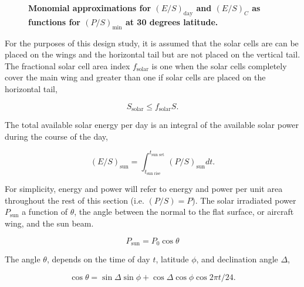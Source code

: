 \documentclass[]{aiaa-tc}%
\begin{document}
\begin{figure}[H]
 \begin{subfigmatrix}{2}%
 \end{subfigmatrix}
 \caption{\textbf{Monomial approximations for $(E/S)_{\text{day}}$ and $(E/S)_C$ as functions for $(P/S)_{\text{min}}$ at 30 degrees latitude.}}
 \label{f:energyapprox}
\end{figure}

    For the purposes of this design study, it is assumed that the solar cells are can be placed on the wings and the horizontal tail but are not placed on the vertical tail.  
    The fractional solar cell area index $f_{\text{solar}}$ is one when the solar cells completely cover the main wing and greater than one if solar cells are placed on the horizontal tail,

\begin{equation}
    \label{e:solarssolar}
    S_{\text{solar}} \leq f_{\text{solar}}S.
\end{equation}

The total available solar energy per day is an integral of the available solar power during the course of the day,

    \begin{equation}
        \label{e:solares}
        (E/S)_{\text{sun}} = \int_{t_{\text{sun rise}}}^{t_{\text{sun set}}} (P/S)_{\text{sun}} dt.
    \end{equation}
    
For simplicity, energy and power will refer to energy and power per unit area throughout the rest of this section (i.e. $(P/S) = P$). 
The solar irradiated power $P_{\text{sun}}$ a function of $\theta$, the angle between the normal to the flat surface, or aircraft wing, and the sun beam.\cite{solar}

\begin{equation}
    \label{e:solarp}
    P_{\text{sun}} = P_0 \cos{\theta}
\end{equation}

The angle $\theta$, depends on the time of day $t$, latitude $\phi$, and declination angle $\Delta$,\cite{solar}

    \begin{equation}
        \label{e:solartheta}
        \cos{\theta} = \sin{\Delta} \sin{\phi} + \cos{\Delta} \cos{\phi} \cos{2\pi t/24}.
    \end{equation}
\end{document}
